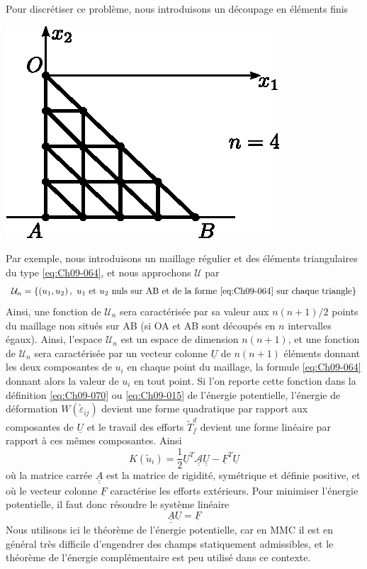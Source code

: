Pour discrétiser ce problème, nous introduisons un découpage en éléments finis 
\begin{center}
    \includegraphics{../images/T1_Ch09-07}
\end{center}
Par exemple, nous introduisons un maillage régulier et des éléments triangulaires du type \eqref{eq:Ch09-064}, et nous approchons $\mathcal{U}$ par
\[
\mathcal{U}_n = \left\{ \left( u_1, u_2 \right),\ u_1 \text{ et } u_2\ \text{nuls sur AB et de la forme~\eqref{eq:Ch09-064} sur chaque triangle} \right\}
\]
Ainsi, une fonction de $\mathcal{U}_n$ sera caractérisée par sa valeur aux $n(n+1)/2$ points du maillage non situés sur AB (si OA et AB sont découpés en $n$ intervalles égaux).
Ainsi, l'espace $\mathcal{U}_n$ est un espace de dimension $n(n+1)$, et une fonction de $\mathcal{U}_n$ sera caractérisée par un vecteur colonne $\underline{U}$ de $n(n+1)$ éléments donnant les deux composantes de $u_i$ en chaque point du maillage, la formule \eqref{eq:Ch09-064} donnant alors la valeur de $u_i$ en tout point.
Si l'on reporte cette fonction dans la définition \eqref{eq:Ch09-070} ou \eqref{eq:Ch09-015} de l'énergie potentielle, l'énergie de déformation $W\left( \tilde{\varepsilon}_{ij} \right)$ devient une forme quadratique par rapport aux composantes de $\underline{U}$ et le travail des efforts $\tilde{T}_f^d$ devient une forme linéaire par rapport à ces mêmes composantes.
Ainsi 
\begin{equation}
    K \left( \tilde{u}_i \right) = \frac{1}{2} \underline{U}^T \underline{\underline{\mathcal{A}}} \underline{\underline{U}} - \underline{F}^T \underline{U}
    \label{eq:Ch09-071}
\end{equation}
où la matrice carrée $\underline{\underline{A}}$ est la matrice de rigidité, symétrique et définie positive, et où le vecteur colonne $\underline{F}$ caractérise les efforts extérieurs.
Pour minimiser l'énergie potentielle, il faut donc résoudre le système 
linéaire 
\begin{equation}
    \underline{\underline{A}} \underline{U} = \underline{F}
    \label{eq:Ch09-072}
\end{equation}
Nous utilisons ici le théorème de l'énergie potentielle, car en 
MMC il est en général très difficile d'engendrer des champs statiquement admissibles, et le théorème de l'énergie complémentaire est peu utilisé dans ce contexte. 
